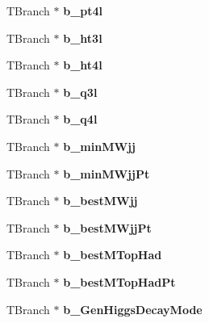 \begin{DoxyCompactItemize}
\item 
\hypertarget{classMiniTree_a0edede6f1ec01077a70223667945432e}{}\label{classMiniTree_a0edede6f1ec01077a70223667945432e} 
T\+Branch $\ast$ {\bfseries b\+\_\+pt4l}
\item 
\hypertarget{classMiniTree_a62424b489db8a66d451cd4f6117f7286}{}\label{classMiniTree_a62424b489db8a66d451cd4f6117f7286} 
T\+Branch $\ast$ {\bfseries b\+\_\+ht3l}
\item 
\hypertarget{classMiniTree_aa385f379deacaf22a5e22852a6399ac4}{}\label{classMiniTree_aa385f379deacaf22a5e22852a6399ac4} 
T\+Branch $\ast$ {\bfseries b\+\_\+ht4l}
\item 
\hypertarget{classMiniTree_a5839531e7d638769ba2c6596e23a53bc}{}\label{classMiniTree_a5839531e7d638769ba2c6596e23a53bc} 
T\+Branch $\ast$ {\bfseries b\+\_\+q3l}
\item 
\hypertarget{classMiniTree_a2a68f4c0ac6b7287af42e925cc16a8ea}{}\label{classMiniTree_a2a68f4c0ac6b7287af42e925cc16a8ea} 
T\+Branch $\ast$ {\bfseries b\+\_\+q4l}
\item 
\hypertarget{classMiniTree_aadfd4786a7bc36f926d2fb06baa78089}{}\label{classMiniTree_aadfd4786a7bc36f926d2fb06baa78089} 
T\+Branch $\ast$ {\bfseries b\+\_\+min\+M\+Wjj}
\item 
\hypertarget{classMiniTree_a8b6e459f953510bca08a28d3c436ef7c}{}\label{classMiniTree_a8b6e459f953510bca08a28d3c436ef7c} 
T\+Branch $\ast$ {\bfseries b\+\_\+min\+M\+Wjj\+Pt}
\item 
\hypertarget{classMiniTree_ae7feab85886d4ba67d53d876d9fbbeef}{}\label{classMiniTree_ae7feab85886d4ba67d53d876d9fbbeef} 
T\+Branch $\ast$ {\bfseries b\+\_\+best\+M\+Wjj}
\item 
\hypertarget{classMiniTree_a33479551ebe27e053583de0c6afd4023}{}\label{classMiniTree_a33479551ebe27e053583de0c6afd4023} 
T\+Branch $\ast$ {\bfseries b\+\_\+best\+M\+Wjj\+Pt}
\item 
\hypertarget{classMiniTree_a4715d9045704dba708580aceab6124e7}{}\label{classMiniTree_a4715d9045704dba708580aceab6124e7} 
T\+Branch $\ast$ {\bfseries b\+\_\+best\+M\+Top\+Had}
\item 
\hypertarget{classMiniTree_a09b7d4217ffb4d06b05feb47f03790ca}{}\label{classMiniTree_a09b7d4217ffb4d06b05feb47f03790ca} 
T\+Branch $\ast$ {\bfseries b\+\_\+best\+M\+Top\+Had\+Pt}
\item 
\hypertarget{classMiniTree_afbc897d2a70dce8c5e4feeb450ee3b64}{}\label{classMiniTree_afbc897d2a70dce8c5e4feeb450ee3b64} 
T\+Branch $\ast$ {\bfseries b\+\_\+\+Gen\+Higgs\+Decay\+Mode}
\item 

\end{DoxyCompactItemize}
